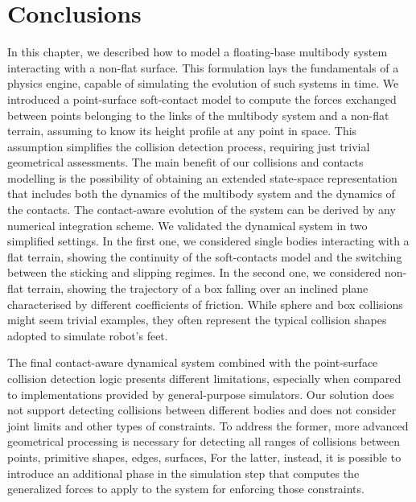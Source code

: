 \newpage
\section{Conclusions}

In this chapter, we described how to model a floating-base multibody system interacting with a non-flat surface.
This formulation lays the fundamentals of a physics engine, capable of simulating the evolution of such systems in time.
We introduced a point-surface soft-contact model to compute the forces exchanged between points belonging to the links of the multibody system and a non-flat terrain, assuming to know its height profile at any point in space.
This assumption simplifies the collision detection process, requiring just trivial geometrical assessments.
The main benefit of our collisions and contacts modelling is the possibility of obtaining an extended state-space representation that includes both the dynamics of the multibody system and the dynamics of the contacts.
The contact-aware evolution of the system can be derived by any numerical integration scheme.
We validated the dynamical system in two simplified settings.
In the first one, we considered single bodies interacting with a flat terrain, showing the continuity of the soft-contacts model and the switching between the sticking and slipping regimes.
In the second one, we considered non-flat terrain, showing the trajectory of a box falling over an inclined plane characterised by different coefficients of friction.
While sphere and box collisions might seem trivial examples, they often represent the typical collision shapes adopted to simulate robot's feet.

The final contact-aware dynamical system combined with the point-surface collision detection logic presents different limitations, especially when compared to implementations provided by general-purpose simulators.
Our solution does not support detecting collisions between different bodies and does not consider joint limits and other types of constraints.
To address the former, more advanced geometrical processing is necessary for detecting all ranges of collisions between points, primitive shapes, edges, surfaces, \etc
For the latter, instead, it is possible to introduce an additional phase in the simulation step that computes the generalized forces to apply to the system for enforcing those constraints.
